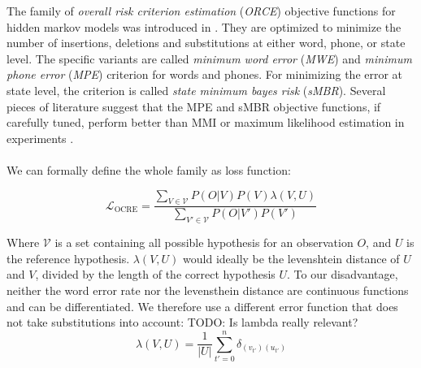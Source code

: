 The family of \textit{overall risk criterion estimation} (\textit{ORCE}) objective functions for hidden markov models was introduced in \cite{kaiser2000novel}. They are optimized to minimize the number of insertions, deletions and substitutions at either word, phone, or state level. The specific variants are called \textit{minimum word error} (\textit{MWE}) and \textit{minimum phone error} (\textit{MPE}) criterion for words and phones. For minimizing the error at state level, the criterion is called \textit{state minimum bayes risk} (\textit{sMBR}). Several pieces of literature suggest that the MPE and sMBR objective functions, if carefully tuned, perform better than MMI or maximum likelihood estimation in experiments \cite{povey2002minimum}\cite{gibson2008minimum}\cite{povey2005discriminative}\cite{peddinti2015jhu}. \\ \\
We can formally define the whole family as loss function: 

\[
\mathcal{L}_{\text{OCRE}} = \frac{\sum_{V \in \mathcal{V}} P(O|V)P(V) \lambda(V,U)}{\sum_{V' \in \mathcal{V}} P(O|V')P(V')} 
\]

Where $\mathcal{V}$ is a set containing all possible hypothesis for an observation $O$, and $U$ is the reference hypothesis. $\lambda(V,U)$ would ideally be the levenshtein distance of $U$ and $V$, divided by the length of the correct hypothesis $U$. To our disadvantage, neither the word error rate nor the levensthein distance are continuous functions and can be differentiated. We therefore use a different error function that does not take substitutions into account:
TODO: Is lambda really relevant?
\[
\lambda(V, U) = \frac{1}{|U|} \sum^{n}_{t' = 0} \delta_{(v_{t'})(u_{t'})}
\]

